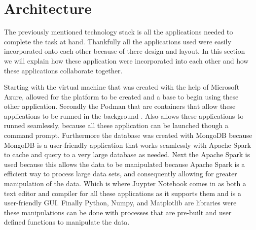 \documentclass[conference,twoside]{IEEEtran}
\begin{document}
\section{Architecture}
The previously mentioned technology stack is all the applications needed to complete the task at hand. Thankfully all the applications used were easily incorporated onto each other because of there design and layout. In this section we will explain how these application were incorporated into each other and how these applications collaborate together.

Starting with the virtual machine that was created with the help of Microsoft Azure, allowed for the platform to be created and a base to begin using these other application. Secondly the Podman that are containers that allow these applications to be runned in the background . Also allows these applications to runned seamlessly, because all these application can be launched though a command prompt. Furthermore the database was created with MongoDB because MongoDB is a user-friendly application that works seamlessly with Apache Spark to cache and query to a very large database as needed. Next the Apache Spark is used because this allows the data to be manipulated because Apache Spark is a efficient way to process large data sets, and consequently allowing for greater manipulation of the data. Which is where Juypter Notebook comes in as both a text editor and compiler for all these applications as it supports them and is a user-friendly GUI. Finally Python, Numpy, and Matplotlib are libraries were these manipulations can be done with processes that are pre-built and user defined functions to manipulate the data.

\end{document}
